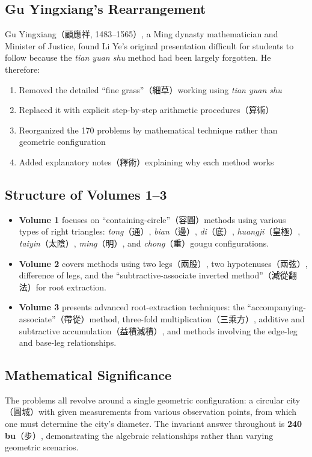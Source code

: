 \documentclass[11pt,a4paper]{article}
\newcounter{problem}[section]
\begin{document}
\subsection*{Gu Yingxiang's Rearrangement}
Gu Yingxiang（顧應祥, 1483--1565）, a Ming dynasty mathematician and Minister of Justice, found Li Ye's original presentation difficult for students to follow because the \textit{tian yuan shu} method had been largely forgotten. He therefore:
\begin{enumerate}
\item Removed the detailed ``fine grass''（細草）working using \textit{tian yuan shu}
\item Replaced it with explicit step-by-step arithmetic procedures（算術）
\item Reorganized the 170 problems by mathematical technique rather than geometric configuration
\item Added explanatory notes（釋術）explaining why each method works
\end{enumerate}

\subsection*{Structure of Volumes 1--3}
\begin{itemize}
\item \textbf{Volume 1} focuses on ``containing-circle''（容圓）methods using various types of right triangles: \textit{tong}（通）, \textit{bian}（邊）, \textit{di}（底）, \textit{huangji}（皇極）, \textit{taiyin}（太陰）, \textit{ming}（明）, and \textit{chong}（重）gougu configurations.
\item \textbf{Volume 2} covers methods using two legs（兩股）, two hypotenuses（兩弦）, difference of legs, and the ``subtractive-associate inverted method''（減從翻法）for root extraction.
\item \textbf{Volume 3} presents advanced root-extraction techniques: the ``accompanying-associate''（帶從）method, three-fold multiplication（三乘方）, additive and subtractive accumulation（益積減積）, and methods involving the edge-leg and base-leg relationships.
\end{itemize}

\subsection*{Mathematical Significance}
The problems all revolve around a single geometric configuration: a circular city（圓城）with given measurements from various observation points, from which one must determine the city's diameter. The invariant answer throughout is \textbf{240 bu}（步）, demonstrating the algebraic relationships rather than varying geometric scenarios.
\end{document}
